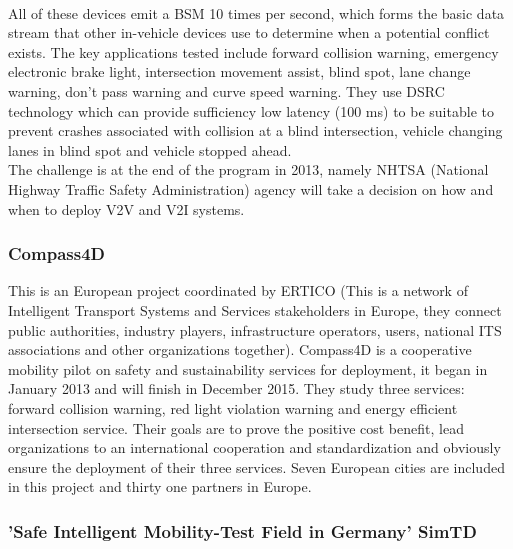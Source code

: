 \documentclass[a4paper]{article}
\begin{document}
\paragraph{}All of these devices emit a BSM 10 times per second, which forms the basic data stream that other in-vehicle devices use to determine when a potential conflict exists. The key applications tested include forward collision warning, emergency electronic brake light, intersection movement assist, blind spot, lane change warning, don't pass warning and curve speed warning. They use DSRC technology which can provide sufficiency low latency (100 ms) to be suitable to prevent crashes associated with collision at a blind intersection, vehicle changing lanes in blind spot and vehicle stopped ahead.\\
The challenge is at the end of the program in 2013, namely NHTSA (National Highway Traffic Safety Administration) agency will take a decision on how and when to deploy V2V and V2I systems.

\subsubsection{Compass4D}
\label{Compass4D}

This is an European project coordinated by ERTICO (This is a network of Intelligent Transport Systems and Services stakeholders in Europe, they connect public authorities, industry players, infrastructure operators, users, national ITS associations and other organizations together). Compass4D is a cooperative mobility pilot on safety and sustainability services for deployment, it began in January 2013 and will finish in December 2015. They study three services: forward collision warning, red light violation warning and energy efficient intersection service. Their goals are to prove the positive cost benefit, lead organizations to an international cooperation and standardization and obviously ensure the deployment of their three services. Seven European cities are included in this project and thirty one partners in Europe.

\subsubsection{'Safe Intelligent Mobility-Test Field in Germany' SimTD}
\label{SIMTD}
\end{document}
